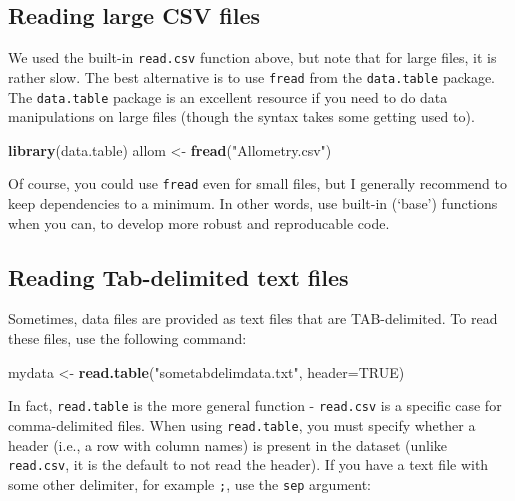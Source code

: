 \documentclass[]{book}
\newenvironment{Shaded}{\begin{snugshade}}{\end{snugshade}}
\newcommand{\DataTypeTok}[1]{\textcolor[rgb]{0.13,0.29,0.53}{#1}}
\newcommand{\KeywordTok}[1]{\textcolor[rgb]{0.13,0.29,0.53}{\textbf{#1}}}
\newcommand{\NormalTok}[1]{#1}
\newcommand{\OtherTok}[1]{\textcolor[rgb]{0.56,0.35,0.01}{#1}}
\newcommand{\StringTok}[1]{\textcolor[rgb]{0.31,0.60,0.02}{#1}}
\begin{document}
\hypertarget{reading-large-csv-files}{%
\subsection{Reading large CSV files}\label{reading-large-csv-files}}

We used the built-in \texttt{read.csv} function above, but note that for large files, it is rather slow. The best alternative is to use \texttt{fread} from the \texttt{data.table} package. The \texttt{data.table} package is an excellent resource if you need to do data manipulations on large files (though the syntax takes some getting used to).

\begin{Shaded}
\begin{Highlighting}[]
\KeywordTok{library}\NormalTok{(data.table)}
\NormalTok{allom <-}\StringTok{ }\KeywordTok{fread}\NormalTok{(}\StringTok{"Allometry.csv"}\NormalTok{)}
\end{Highlighting}
\end{Shaded}

Of course, you could use \texttt{fread} even for small files, but I generally recommend to keep dependencies to a minimum. In other words, use built-in (`base') functions when you can, to develop more robust and reproducable code.

\hypertarget{tabdelimtext}{%
\subsection{Reading Tab-delimited text files}\label{tabdelimtext}}

Sometimes, data files are provided as text files that are TAB-delimited. To read these files, use the following command:

\begin{Shaded}
\begin{Highlighting}[]
\NormalTok{mydata <-}\StringTok{ }\KeywordTok{read.table}\NormalTok{(}\StringTok{"sometabdelimdata.txt"}\NormalTok{, }\DataTypeTok{header=}\OtherTok{TRUE}\NormalTok{)}
\end{Highlighting}
\end{Shaded}

In fact, \texttt{read.table} is the more general function - \texttt{read.csv} is a specific case for comma-delimited files. When using \texttt{read.table}, you must specify whether a header (i.e., a row with column names) is present in the dataset (unlike \texttt{read.csv}, it is the default to not read the header). If you have a text file with some other delimiter, for example \texttt{;}, use the \texttt{sep} argument:
\end{document}
